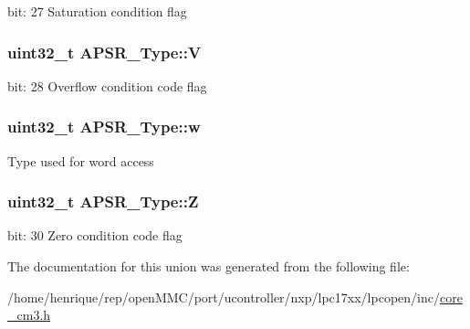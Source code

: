 bit\-: 27 Saturation condition flag \hypertarget{unionAPSR__Type_a8004d224aacb78ca37774c35f9156e7e}{
\subsubsection[{V}]{\setlength{\rightskip}{0pt plus 5cm}uint32\-\_\-t A\-P\-S\-R\-\_\-\-Type\-::\-V}}\label{unionAPSR__Type_a8004d224aacb78ca37774c35f9156e7e}
bit\-: 28 Overflow condition code flag \hypertarget{unionAPSR__Type_ae4c2ef8c9430d7b7bef5cbfbbaed3a94}{
\subsubsection[{w}]{\setlength{\rightskip}{0pt plus 5cm}uint32\-\_\-t A\-P\-S\-R\-\_\-\-Type\-::w}}\label{unionAPSR__Type_ae4c2ef8c9430d7b7bef5cbfbbaed3a94}
Type used for word access \hypertarget{unionAPSR__Type_a3b04d58738b66a28ff13f23d8b0ba7e5}{
\subsubsection[{Z}]{\setlength{\rightskip}{0pt plus 5cm}uint32\-\_\-t A\-P\-S\-R\-\_\-\-Type\-::\-Z}}\label{unionAPSR__Type_a3b04d58738b66a28ff13f23d8b0ba7e5}
bit\-: 30 Zero condition code flag 

The documentation for this union was generated from the following file\-:\begin{DoxyCompactItemize}
\item 
/home/henrique/rep/open\-M\-M\-C/port/ucontroller/nxp/lpc17xx/lpcopen/inc/\hyperlink{core__cm3_8h}{core\-\_\-cm3.\-h}\end{DoxyCompactItemize}
